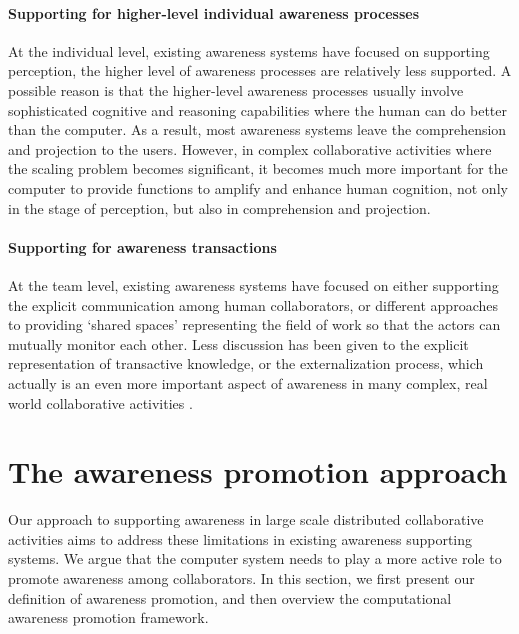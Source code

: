 \paragraph*{Supporting for higher-level individual awareness processes} %
\label{par:supporting_for_higher_level_individual_awareness_processes}
At the individual level, existing awareness systems have focused on supporting perception, the higher level of awareness processes are relatively less supported. A possible reason is that the higher-level awareness processes usually involve sophisticated cognitive and reasoning capabilities where the human can do better than the computer. As a result, most awareness systems leave the comprehension and projection to the users. However, in complex collaborative activities where the scaling problem becomes significant, it becomes much more important for the computer to provide functions to amplify and enhance human cognition, not only in the stage of perception, but also in comprehension and projection.

\paragraph*{Supporting for awareness transactions} %
\label{par:supporting_for_awareness_transactions}
At the team level, existing awareness systems have focused on either supporting the explicit communication among human collaborators, or different approaches to providing `shared spaces' representing the field of work so that the actors can mutually monitor each other. Less discussion has been given to the explicit representation of transactive knowledge, or the externalization process, which actually is an even more important aspect of awareness in many complex, real world collaborative activities \cite{heath2002a}.

\section{The awareness promotion approach} %
\label{sec:awareness_promotion_approach}
Our approach to supporting awareness in large scale distributed collaborative activities aims to address these limitations in existing awareness supporting systems. We argue that the computer system needs to play a more active role to promote awareness among collaborators. In this section, we first present our definition of awareness promotion, and then overview the computational awareness promotion framework.

